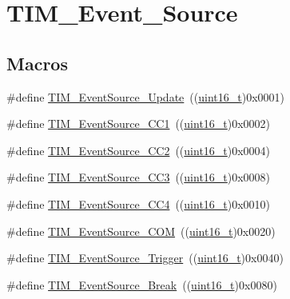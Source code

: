 \hypertarget{group___t_i_m___event___source}{}\section{T\+I\+M\+\_\+\+Event\+\_\+\+Source}
\label{group___t_i_m___event___source}
\subsection*{Macros}
\begin{DoxyCompactItemize}
\item 
\#define \hyperlink{group___t_i_m___event___source_ga5bff72fbe94b1ae5a710e402c9868b23}{T\+I\+M\+\_\+\+Event\+Source\+\_\+\+Update}~((\hyperlink{_p_e___types_8h_a1f1825b69244eb3ad2c7165ddc99c956}{uint16\+\_\+t})0x0001)
\item 
\#define \hyperlink{group___t_i_m___event___source_gaa634c46d4ac521ad16e25be97b487e8a}{T\+I\+M\+\_\+\+Event\+Source\+\_\+\+C\+C1}~((\hyperlink{_p_e___types_8h_a1f1825b69244eb3ad2c7165ddc99c956}{uint16\+\_\+t})0x0002)
\item 
\#define \hyperlink{group___t_i_m___event___source_ga5e2082a09552acc9c7e9577f104ba15a}{T\+I\+M\+\_\+\+Event\+Source\+\_\+\+C\+C2}~((\hyperlink{_p_e___types_8h_a1f1825b69244eb3ad2c7165ddc99c956}{uint16\+\_\+t})0x0004)
\item 
\#define \hyperlink{group___t_i_m___event___source_gafeb8538e3b00d938e061e5051f83836b}{T\+I\+M\+\_\+\+Event\+Source\+\_\+\+C\+C3}~((\hyperlink{_p_e___types_8h_a1f1825b69244eb3ad2c7165ddc99c956}{uint16\+\_\+t})0x0008)
\item 
\#define \hyperlink{group___t_i_m___event___source_gab60e3190e6c09d2d067f2c689d614979}{T\+I\+M\+\_\+\+Event\+Source\+\_\+\+C\+C4}~((\hyperlink{_p_e___types_8h_a1f1825b69244eb3ad2c7165ddc99c956}{uint16\+\_\+t})0x0010)
\item 
\#define \hyperlink{group___t_i_m___event___source_ga4c06981037fae91786f966aa9b4b3435}{T\+I\+M\+\_\+\+Event\+Source\+\_\+\+C\+OM}~((\hyperlink{_p_e___types_8h_a1f1825b69244eb3ad2c7165ddc99c956}{uint16\+\_\+t})0x0020)
\item 
\#define \hyperlink{group___t_i_m___event___source_ga24835bf5eac25eed90069208dce22564}{T\+I\+M\+\_\+\+Event\+Source\+\_\+\+Trigger}~((\hyperlink{_p_e___types_8h_a1f1825b69244eb3ad2c7165ddc99c956}{uint16\+\_\+t})0x0040)
\item 
\#define \hyperlink{group___t_i_m___event___source_gad6f9b5366d93c73ff005273c50c9f00a}{T\+I\+M\+\_\+\+Event\+Source\+\_\+\+Break}~((\hyperlink{_p_e___types_8h_a1f1825b69244eb3ad2c7165ddc99c956}{uint16\+\_\+t})0x0080)

\end{DoxyCompactItemize}
